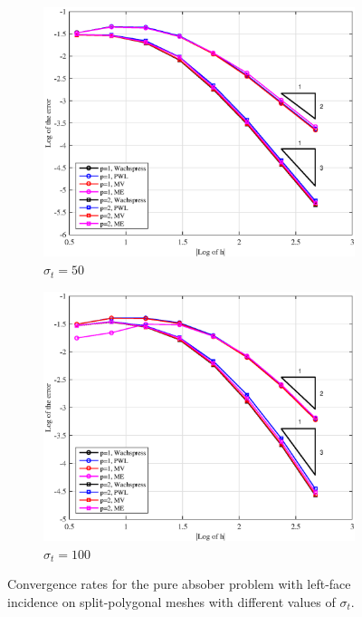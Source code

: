 \begin{figure}
{\begin{subfigure}[b]{0.485\textwidth}
	\end{subfigure}
}
\vspace{1cm}
{
	\begin{subfigure}[b]{0.485\textwidth}
		\centering
		\label{subfig::PA_Left_SplitPoly_sig50}
		\includegraphics[width=\textwidth]{figures/sec_BF/PAErr_Left_SplitPoly_sig50.eps}
	\caption{$\sigma_t = 50$}
	\end{subfigure}
	\hfill
	\begin{subfigure}[b]{0.485\textwidth}
		\centering
		\label{subfig::PA_Left_SplitPoly_sig100}
		\includegraphics[width=\textwidth]{figures/sec_BF/PAErr_Left_SplitPoly_sig100.eps}
	\caption{$\sigma_t = 100$}
	\end{subfigure}
}
\caption{Convergence rates for the pure absober problem with left-face incidence on split-polygonal meshes with different values of $\sigma_t$.}
\label{fig::BF_Results_PA_Left_SplitPoly}
\end{figure}

